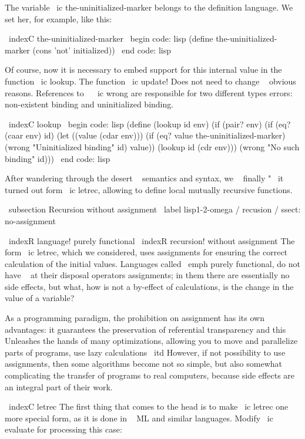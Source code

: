 {The variable \ ic {the-uninitialized-marker} belongs to the definition language. We set
her, for example, like this:

\ indexC {the-uninitialized-marker}
\ begin {code: lisp}
(define the-uninitialized-marker (cons 'not' initialized))
\ end {code: lisp}

Of course, now it is necessary to embed support for this internal value
in the function \ ic {lookup}. The function \ ic {update!} Does not need to change ~
obvious reasons. References to ~ \ ic {wrong} are responsible for two different types
errors: non-existent binding and uninitialized binding.

\ indexC {lookup}
\ begin {code: lisp}
(define (lookup id env)
  (if (pair? env)
      (if (eq? (caar env) id)
          (let ((value (cdar env)))
            (if (eq? value the-uninitialized-marker)
                (wrong "Uninitialized binding" id)
                value))
          (lookup id (cdr env)))
      (wrong "No such binding" id)))
\ end {code: lisp}

After wandering through the desert ~ semantics and syntax, we ~ finally "~ it turned out
form \ ic {letrec}, allowing to define local mutually recursive functions.


\ subsection {Recursion without assignment} %
\ label {lisp1-2-omega / recusion / ssect: no-assignment}

\ indexR {language! purely functional}
\ indexR {recursion! without assignment}
The form \ ic {letrec}, which we considered, uses assignments for
ensuring the correct calculation of the initial values. Languages ​​called
\ emph {purely functional}, do not have ~ at their disposal operators
assignments; in them there are essentially no side effects, but what, how
is not a by-effect of calculations, is the change in the value of a variable?

As a programming paradigm, the prohibition on assignment has its own
advantages: it guarantees the preservation of referential transparency and this
Unleashes the hands of many optimizations, allowing you to move and parallelize
parts of programs, use lazy calculations { \ itd } However, if not
possibility to use assignments, then some algorithms become
not so simple, but also somewhat complicating the transfer of programs to real
computers, because side effects are an integral part of their work.

\ indexC { letrec }
The first thing that comes to the head is to make \ ic {letrec} one more special
form, as it is done in ~ ML and similar languages. Modify \ ic {evaluate}
for processing this case:

}
